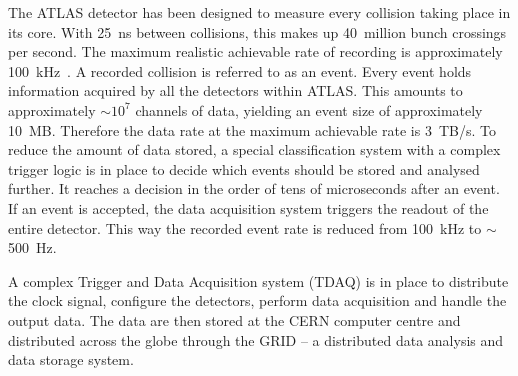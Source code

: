 The ATLAS detector has been designed to measure every collision taking place in its core. With 25~ns between collisions, this makes up 40~million bunch crossings per second. The maximum realistic achievable rate of recording is approximately 100~kHz~\cite{Jenni:1193085}. A recorded collision is referred to as an event. Every event holds information acquired by all the detectors within ATLAS. This amounts to approximately $\sim$$10^7$ channels of data, yielding an event size of approximately 10~MB. Therefore the data rate at the maximum achievable rate is 3~TB/s. To reduce the amount of data stored, a special classification system with a complex trigger logic is in place to decide which events should be stored and analysed further. It reaches a decision in the order of tens of microseconds after an event. If an event is accepted, the data acquisition system triggers the readout of the entire detector. This way the recorded event rate is reduced from 100~kHz to $\sim$500~Hz.

A complex Trigger and Data Acquisition system (TDAQ) is in place to distribute the clock signal, configure the detectors, perform data acquisition and handle the output data. The data are then stored at the CERN computer centre and distributed across the globe through the GRID -- a distributed data analysis and data storage system.



